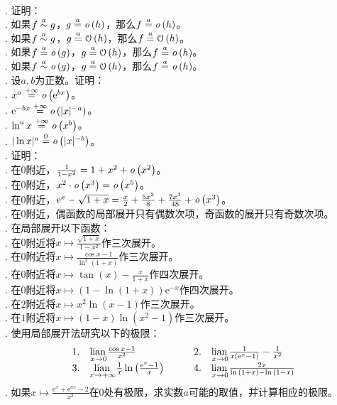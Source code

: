 \documentclass[12pt,UTF8]{ctexbook}
\begin{document}
\begin{xt}
    \mbox{} \\
    . 证明：\\
    . 如果$f \overset{a}{\sim} g$，$g \overset{a}{=} \mathit{o}\left(h\right)$，那么$f \overset{a}{=} \mathit{o}\left(h\right)$。\\
    . 如果$f \overset{a}{\sim} g$，$g \overset{a}{=} \mathcal{O}\left(h\right)$，那么$f \overset{a}{=} \mathcal{O}\left(h\right)$。\\
    . 如果$f \overset{a}{=} \mathit{o}\left(g\right)$，$g \overset{a}{=} \mathcal{O}\left(h\right)$，那么$f \overset{a}{=} \mathit{o}\left(h\right)$。\\
    . 如果$f \overset{a}{\sim} \mathit{o}\left(g\right)$，$g \overset{a}{=} \mathcal{O}\left(h\right)$，那么$f \overset{a}{=} \mathit{o}\left(h\right)$。\\
    . 设$a, b$为正数。证明：\\
    . $x^a \overset{+\infty}{=} \mathit{o}\left(\mathrm{e}^{bx}\right)$。\\
    . $\mathrm{e}^{-bx} \overset{+\infty}{=} \mathit{o}\left(|x|^{-a}\right)$。\\
    . $\ln^{a}{x} \overset{+\infty}{=} \mathit{o}\left(x^{b}\right)$。\\
    . $|\ln{x}|^{a} \overset{0}{=} \mathit{o}\left(|x|^{-b}\right)$。\\
    . 证明：\\
    . 在$0$附近，$\frac{1}{1 - x^2} = 1 + x^2 + \mathit{o}\left(x^2\right)$。\\
    . 在$0$附近，$x^2 \cdot \mathit{o}\left(x^3\right) = \mathit{o}\left(x^5\right)$。\\
    . 在$0$附近，$\mathrm{e}^x - \sqrt{1 + x} = \frac{x}{2} + \frac{5x^2}{8} + \frac{7x^3}{48} + \mathit{o}\left(x^3\right)$。\\
    . 在$0$附近，偶函数的局部展开只有偶数次项，奇函数的展开只有奇数次项。\\
    . 在局部展开以下函数：\\
    . 在$0$附近将$x\mapsto \frac{\sqrt{1 + x}}{1 - x^2}$作三次展开。\\
    . 在$0$附近将$x\mapsto \frac{\cos{x} - 1}{\ln^2{(1 + x)}}$作三次展开。\\
    . 在$0$附近将$x\mapsto \tan{(x)} - \frac{x}{1 + x}$作四次展开。\\
    . 在$0$附近将$x\mapsto (1 - \ln{(1 + x)})\mathrm{e}^{-x}$作四次展开。\\
    . 在$2$附近将$x\mapsto x^2\ln{(x - 1)}$作三次展开。\\
    . 在$1$附近将$x\mapsto (1 - x)\ln{(x^2 - 1)}$作三次展开。\\
    . 使用局部展开法研究以下的极限：\\
    $$
    \begin{array}{ll}
        1. \quad \underset{x\to 0}{\operatorname{lian}\,} \frac{\cos{x} - 1}{x^2} & \qquad 2. \quad \underset{x\to 0}{\operatorname{lian}\,} \frac{1}{x \left(\mathrm{e}^x - 1\right)} - \frac{1}{x^2} \\
        3. \quad \underset{x\to +\infty}{\operatorname{lian}\,} \frac{1}{x}\ln{\left(\frac{\mathrm{e}^x - 1}{x}\right)} & \qquad 4. \quad \underset{x\to 0}{\operatorname{lian}\,} \frac{2x}{\ln{(1+x)} - \ln{(1-x)}} 
    \end{array}
    $$
    . 如果$x \mapsto \frac{\mathrm{e}^{x} + \mathrm{e}^{ax} - 2}{x^2}$在$0$处有极限，求实数$a$可能的取值，并计算相应的极限。
\end{xt}
\end{document}
